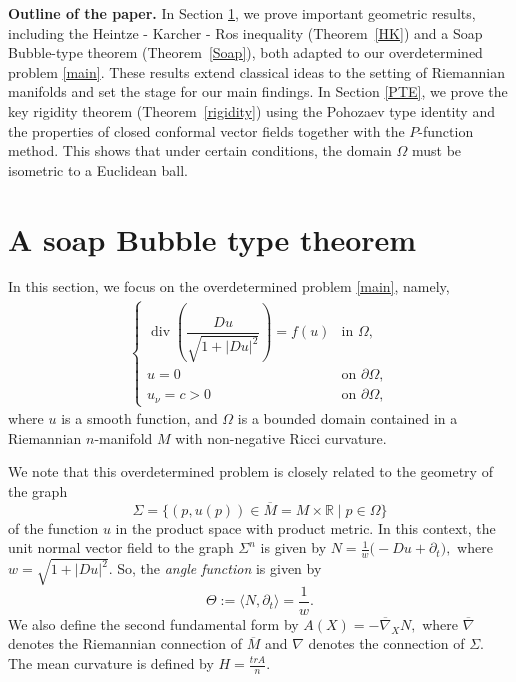 \documentclass[12pt]{amsart}
\theoremstyle{plain}
\numberwithin{equation}{section}
\begin{document}
\textbf{Outline of the paper.} In Section \ref{SBT}, we prove important geometric results, including the Heintze - Karcher - Ros inequality (Theorem~\ref{HK}) and a Soap Bubble-type theorem (Theorem~\ref{Soap}), both adapted to our overdetermined problem \eqref{main}. These results extend classical ideas to the setting of Riemannian manifolds and set the stage for our main findings. In Section \ref{PTE}, we prove the key rigidity theorem (Theorem~\ref{rigidity}) using the Pohozaev type identity and the properties of closed conformal vector fields together with the \( P \)-function method. This shows that under certain conditions, the domain \( \Omega \) must be isometric to a Euclidean ball. 

\section{A soap Bubble type theorem}\label{SBT}

In this section, we focus on the overdetermined problem \eqref{main}, namely,
\begin{align*}
\left\{
\begin{array}{lll}
 \operatorname{div}\left(\dfrac{D u}{\sqrt{1 + |D u|^2}}\right) = f(u) & \text{in } \Omega, \\
u = 0 & \text{on } \partial \Omega, \\
u_{\nu} = c>0 & \text{on } \partial \Omega,
\end{array}
\right.
\end{align*}
where \( u \) is a smooth function, and \( \Omega \) is a bounded domain contained in a Riemannian \( n \)-manifold \( M \) with non-negative Ricci curvature. 

We note that this overdetermined problem is closely related to the geometry of the graph 
\[
\Sigma = \{ (p, u(p)) \in \overline{M} = M \times \mathbb{R} \mid p \in \Omega \}
\]
of the function \( u \) in the product space with product metric. In this context, the unit normal vector field to the graph \( \Sigma^n \) is given by
\(
N = \frac{1}{w} \big( -D u + \partial_t \big),
\)
where \( w = \sqrt{1 + |D u|^2} \).
So, the \textit{angle function} is given by $$\Theta:=\langle N,\partial_t\rangle=\frac{1}{w}.$$
We also define the second fundamental form by 
$A(X)=-\overline{\nabla}_XN,$
where $\overline{\nabla}$ denotes the Riemannian connection of 
$\overline{M}$ and $\nabla$ denotes the connection of $\Sigma.$ The mean curvature is defined by 
$H=\frac{tr A}{n}.$
\end{document}
